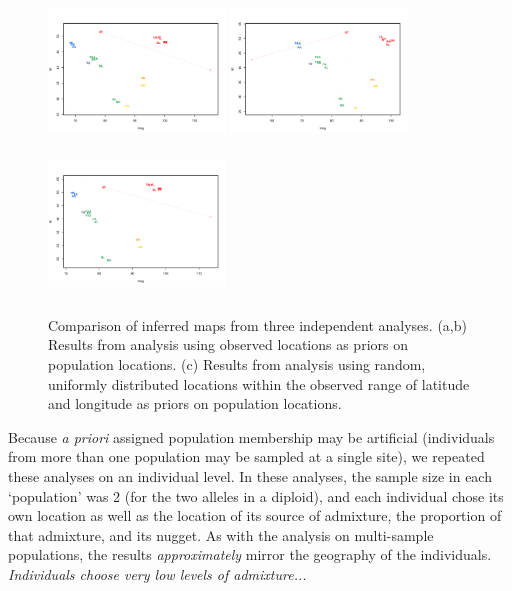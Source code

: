 \documentclass[12pt]{article}
\newcommand{\gc}[1]{{\em \color{blue} #1}}
\begin{document}
\begin{figure}
	\centering
		\subcaptionbox{\label{warb_pop_realpr1}}
			{\includegraphics[width=1.85in,height=1.54in]{figs/population_warbler_map_realpr1.png}}
		\subcaptionbox{\label{warb_pop_realpr2}}			
			{\includegraphics[width=1.85in,height=1.54in]{figs/population_warbler_map_realpr2.png}}
		\subcaptionbox{\label{warb_pop_randpr1}}
			{\includegraphics[width=1.85in,height=1.54in]{figs/population_warbler_map_randpr1.png}}
	\caption{Comparison of inferred maps from three independent analyses.  (a,b) Results from analysis using observed locations as priors on population locations.  (c) Results from analysis using random, uniformly distributed locations within the observed range of latitude and longitude as priors on population locations.}\label{sfig:warbler_pop_compare}
\end{figure}

Because \textit{a priori} assigned population membership may be artificial (individuals from more than one population may be sampled at a single site), we repeated these analyses on an individual level.  In these analyses, the sample size in each `population' was 2 (for the two alleles in a diploid), and each individual chose its own location as well as the location of its source of admixture, the proportion of that admixture, and its nugget.  As with the analysis on multi-sample populations, the results \gc{approximately} mirror the geography of the individuals.  \gc{Individuals choose very low levels of admixture...}
\end{document}
